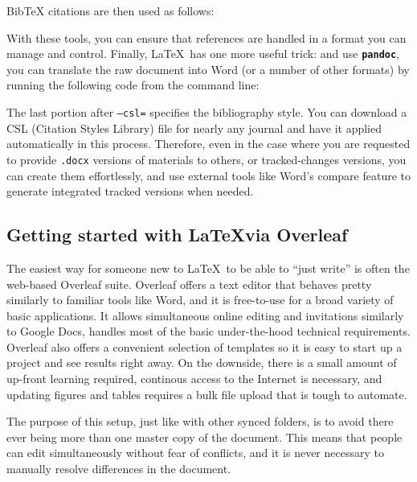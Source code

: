 \noindent BibTeX citations are then used as follows:


With these tools, you can ensure that references are handled
in a format you can manage and control.\cite{flom2005latex}
Finally, \LaTeX\ has one more useful trick:
and use \textbf{\texttt{pandoc}},
you can translate the raw document into Word
(or a number of other formats)
by running the following code from the command line:


\noindent The last portion after \texttt{--csl=} specifies the bibliography style.
You can download a CSL (Citation Styles Library) file
for nearly any journal and have it applied automatically in this process.
Therefore, even in the case where you are requested to provide
\texttt{.docx} versions of materials to others, or tracked-changes versions,
you can create them effortlessly,
and use external tools like Word's compare feature 
to generate integrated tracked versions when needed.

\subsection{Getting started with \LaTeX via Overleaf}

The easiest way for someone new to \LaTeX\ to be able to ``just write''
is often the web-based Overleaf suite.
Overleaf offers a text editor that behaves pretty similarly to familiar tools like Word,
and it is free-to-use for a broad variety of basic applications.
It allows simultaneous online editing and invitations similarly to Google Docs,
handles most of the basic under-the-hood technical requirements.
Overleaf also offers a convenient selection of templates
so it is easy to start up a project and see results right away.
On the downside, there is a small amount of up-front learning required,
continous access to the Internet is necessary,
and updating figures and tables requires a bulk file upload that is tough to automate.

The purpose of this setup, just like with other synced folders,
is to avoid there ever being more than one master copy of the document.
This means that people can edit simultaneously without fear of conflicts,
and it is never necessary to manually resolve differences in the document.

